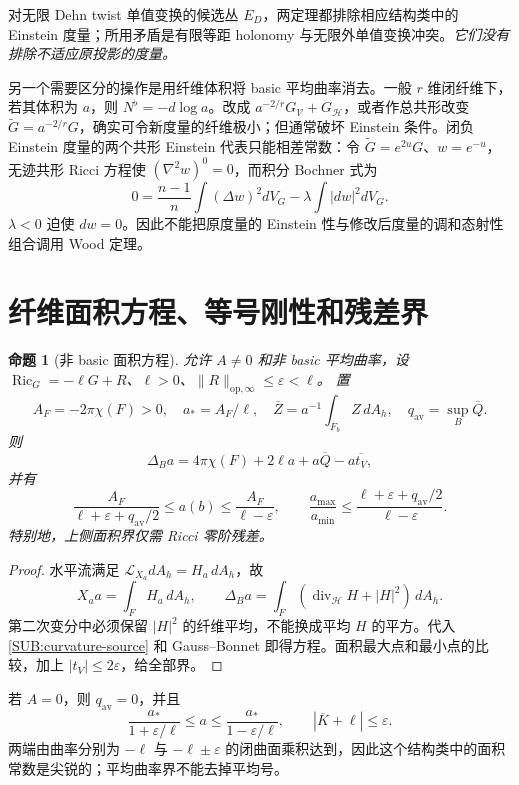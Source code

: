 \documentclass[UTF8,fontset=fandol,zihao=-4,oneside,openany]{ctexbook}
\theoremstyle{cjkplain}
\newtheorem{proposition}[theorem]{命题}
\numberwithin{equation}{chapter}
\begin{document}
对无限 Dehn twist 单值变换的候选丛 $E_D$，两定理都排除相应结构类中的 Einstein 度量；所用矛盾是有限等距 holonomy 与无限外单值变换冲突。\emph{它们没有排除不适应原投影的度量。}

另一个需要区分的操作是用纤维体积将 basic 平均曲率消去。一般 $r$ 维闭纤维下，若其体积为 $a$，则 $N^\flat=-d\log a$。改成 $a^{-2/r}G_{\mathcal V}+G_{\mathcal H}$，或者作总共形改变 $\widetilde G=a^{-2/r}G$，确实可令新度量的纤维极小；但通常破坏 Einstein 条件。闭负 Einstein 度量的两个共形 Einstein 代表只能相差常数：令 $\widetilde G=e^{2u}G$、$w=e^{-u}$，无迹共形 Ricci 方程使 $(\nabla^2w)^0=0$，而积分 Bochner 式为
\[
0=\frac{n-1}{n}\int(\Delta w)^2dV_G-\lambda\int|dw|^2dV_G.
\]
$\lambda<0$ 迫使 $dw=0$。因此不能把原度量的 Einstein 性与修改后度量的调和态射性组合调用 Wood 定理。

\section{纤维面积方程、等号刚性和残差界}

\begin{proposition}[非 basic 面积方程]\label{SUB:area}
允许 $A\ne0$ 和非 basic 平均曲率，设
$\operatorname{Ric}_G=-\ell G+R$、$\ell>0$、$\|R\|_{\mathrm{op},\infty}\le\varepsilon<\ell$。
置
\[
A_F=-2\pi\chi(F)>0,\quad a_*=A_F/\ell,\quad
\overline Z=a^{-1}\int_{F_b}Z\,dA_h,\quad q_{\mathrm{av}}=\sup_B\overline Q.
\]
则
\begin{equation}\label{SUB:area-pde}
\Delta_Ba=4\pi\chi(F)+2\ell a+a\overline Q-a\overline{t_V},
\end{equation}
并有
\begin{equation}\label{SUB:area-bounds}
\frac{A_F}{\ell+\varepsilon+q_{\mathrm{av}}/2}
\le a(b)\le\frac{A_F}{\ell-\varepsilon},\qquad
\frac{a_{\max}}{a_{\min}}
\le\frac{\ell+\varepsilon+q_{\mathrm{av}}/2}{\ell-\varepsilon}.
\end{equation}
特别地，上侧面积界仅需 Ricci 零阶残差。
\end{proposition}
\begin{proof}
水平流满足 $\mathcal L_{X_a}dA_h=H_a\,dA_h$，故
\[
X_aa=\int_FH_a\,dA_h,\qquad
\Delta_Ba=\int_F(\operatorname{div}_{\mathcal H}H+|H|^2)\,dA_h.
\]
第二次变分中必须保留 $|H|^2$ 的纤维平均，不能换成平均 $H$ 的平方。代入 \eqref{SUB:curvature-source} 和 Gauss--Bonnet 即得方程。面积最大点和最小点的比较，加上 $|t_V|\le2\varepsilon$，给全部界。
\end{proof}

若 $A=0$，则 $q_{\mathrm{av}}=0$，并且
\begin{equation}\label{SUB:sharp-area}
\frac{a_*}{1+\varepsilon/\ell}\le a\le
\frac{a_*}{1-\varepsilon/\ell},\qquad
\left|\overline K+\ell\right|\le\varepsilon.
\end{equation}
两端由曲率分别为 $-\ell$ 与 $-\ell\pm\varepsilon$ 的闭曲面乘积达到，因此这个结构类中的面积常数是尖锐的；平均曲率界不能去掉平均号。
\end{document}
